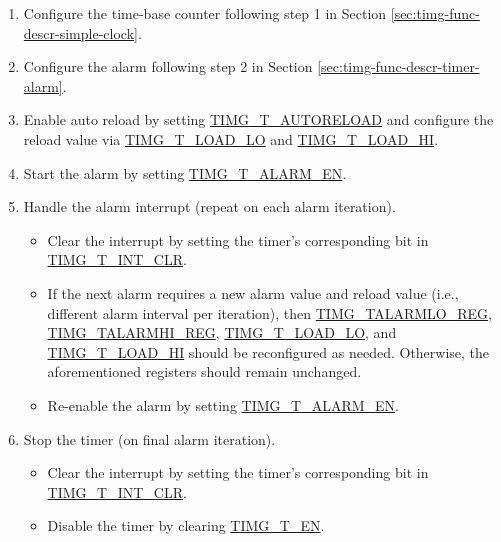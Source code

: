 \documentclass[main\_\_EN.tex]{subfiles}
\begin{document}
\begin{enumerate}
    \item Configure the time-base counter following step 1 in Section \ref{sec:timg-func-descr-simple-clock}.
    \item Configure the alarm following step 2 in Section \ref{sec:timg-func-descr-timer-alarm}.
    \item Enable auto reload by setting \hyperref[fielddesc:TIMGTXAUTORELOAD]{TIMG\_T\_AUTORELOAD} and configure the reload value via \hyperref[fielddesc:TIMGTXLOADLO]{TIMG\_T\_LOAD\_LO} and \hyperref[fielddesc:TIMGTXLOADHI]{TIMG\_T\_LOAD\_HI}.
    \item Start the alarm by setting \hyperref[fielddesc:TIMGTXALARMEN]{TIMG\_T\_ALARM\_EN}.
    \item Handle the alarm interrupt (repeat on each alarm iteration).
    \begin{itemize}
        \item Clear the interrupt by setting the timer's corresponding bit in \hyperref[fielddesc:TIMGTXINTCLR]{TIMG\_T\_INT\_CLR}.
        \item If the next alarm requires a new alarm value and reload value (i.e., different alarm interval per iteration), then \hyperref[regdesc:TIMGTXALARMLOREG]{TIMG\_TALARMLO\_REG}, \hyperref[regdesc:TIMGTXALARMHIREG]{TIMG\_TALARMHI\_REG}, \hyperref[fielddesc:TIMGTXLOADLO]{TIMG\_T\_LOAD\_LO}, and \hyperref[fielddesc:TIMGTXLOADHI]{TIMG\_T\_LOAD\_HI} should be reconfigured as needed. Otherwise, the aforementioned registers should remain unchanged.
        \item Re-enable the alarm by setting \hyperref[fielddesc:TIMGTXALARMEN]{TIMG\_T\_ALARM\_EN}.
    \end{itemize}
    \item Stop the timer (on final alarm iteration).
    \begin{itemize}
        \item Clear the interrupt by setting the timer's corresponding bit in \hyperref[fielddesc:TIMGTXINTCLR]{TIMG\_T\_INT\_CLR}.
        \item Disable the timer by clearing \hyperref[fielddesc:TIMGTXEN]{TIMG\_T\_EN}.
    \end{itemize}
\end{enumerate}
\end{document}
